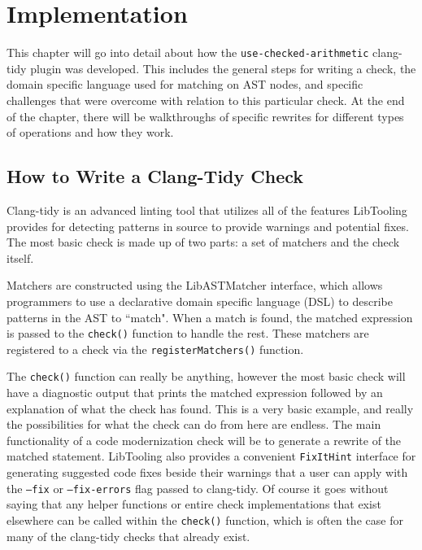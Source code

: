 \chapter{Implementation}
\label{sec:implementation}

This chapter will go into detail about how the \texttt{use-checked-arithmetic} clang-tidy plugin was developed. This includes the general steps for writing a check, the domain specific language used for matching on AST nodes, and specific challenges that were overcome with relation to this particular check. At the end of the chapter, there will be walkthroughs of specific rewrites for different types of operations and how they work.

\section{How to Write a Clang-Tidy Check}

Clang-tidy is an advanced linting tool that utilizes all of the features LibTooling provides for detecting patterns in source to provide warnings and potential fixes. The most basic check is made up of two parts: a set of matchers and the check itself.

Matchers are constructed using the LibASTMatcher interface, which allows programmers to use a declarative domain specific language (DSL) to describe patterns in the AST to ``match". When a match is found, the matched expression is passed to the \texttt{check()} function to handle the rest. These matchers are registered to a check via the \texttt{registerMatchers()} function.

The \texttt{check()} function can really be anything, however the most basic check will have a diagnostic output that prints the matched expression followed by an explanation of what the check has found. This is a very basic example, and really the possibilities for what the check can do from here are endless. The main functionality of a code modernization check will be to generate a rewrite of the matched statement. LibTooling also provides a convenient \texttt{FixItHint} interface for generating suggested code fixes beside their warnings that a user can apply with the \texttt{--fix} or \texttt{--fix-errors} flag passed to clang-tidy. Of course it goes without saying that any helper functions or entire check implementations that exist elsewhere can be called within the \texttt{check()} function, which is often the case for many of the clang-tidy checks that already exist.

